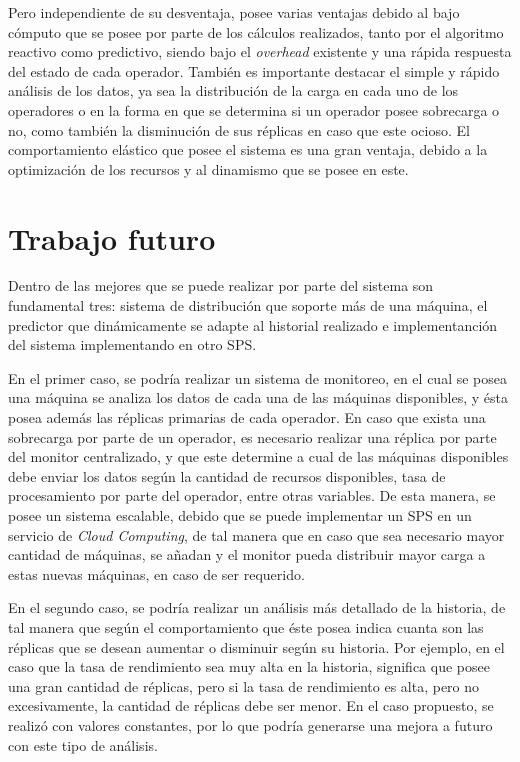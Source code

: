 Pero independiente de su desventaja, posee varias ventajas debido al bajo cómputo que se posee por parte de los cálculos realizados, tanto por el algoritmo reactivo como predictivo, siendo bajo el \textit{overhead} existente y una rápida respuesta del estado de cada operador. También es importante destacar el simple y rápido análisis de los datos, ya sea la distribución de la carga en cada uno de los operadores o en la forma en que se determina si un operador posee sobrecarga o no, como también la disminución de sus réplicas en caso que este ocioso. El comportamiento elástico que posee el sistema es una gran ventaja, debido a la optimización de los recursos y al dinamismo que se posee en este.

\section{Trabajo futuro}
Dentro de las mejores que se puede realizar por parte del sistema son fundamental tres: sistema de distribución que soporte más de una máquina, el predictor que dinámicamente se adapte al historial realizado e implementanción del sistema implementando en otro SPS.

En el primer caso, se podría realizar un sistema de monitoreo, en el cual se posea una máquina se analiza los datos de cada una de las máquinas disponibles, y ésta posea además las réplicas primarias de cada operador. En caso que exista una sobrecarga por parte de un operador, es necesario realizar una réplica por parte del monitor centralizado, y que este determine a cual de las máquinas disponibles debe enviar los datos según la cantidad de recursos disponibles, tasa de procesamiento por parte del operador, entre otras variables. De esta manera, se posee un sistema escalable, debido que se puede implementar un SPS en un servicio de \textit{Cloud Computing}, de tal manera que en caso que sea necesario mayor cantidad de máquinas, se añadan y el monitor pueda distribuir mayor carga a estas nuevas máquinas, en caso de ser requerido.

En el segundo caso, se podría realizar un análisis más detallado de la historia, de tal manera que según el comportamiento que éste posea indica cuanta son las réplicas que se desean aumentar o disminuir según su historia. Por ejemplo, en el caso que la tasa de rendimiento sea muy alta en la historia, significa que posee una gran cantidad de réplicas, pero si la tasa de rendimiento es alta, pero no excesivamente, la cantidad de réplicas debe ser menor. En el caso propuesto, se realizó con valores constantes, por lo que podría generarse una mejora a futuro con este tipo de análisis.


